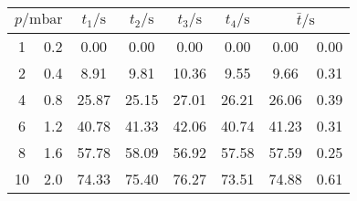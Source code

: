 \label{tab:tabDL1}
	\begin{tabular}{S[table-format=2.0]@{${}\pm{}$} S[table-format=1.1]S[table-format=2.2]S[table-format=2.2]S[table-format=2.2]S[table-format=2.2]S[table-format=2.2]@{${}\pm{}$} S[table-format=1.2]}
		\toprule
		 & {$t_1/\si{\second}$} & {$t_2/\si{\second}$} & {$t_3/\si{\second}$} & {$t_4/\si{\second}$} &  \\
		 & 0.2 & 0.00 & 0.00 & 0.00 & 0.00 & 0.00 & 0.00 \\
		 2 & 0.4 & 8.91 & 9.81 & 10.36 & 9.55 & 9.66 & 0.31 \\
		 4 & 0.8 & 25.87 & 25.15 & 27.01 & 26.21 & 26.06 & 0.39 \\
		 6 & 1.2 & 40.78 & 41.33 & 42.06 & 40.74 & 41.23 & 0.31 \\
		 8 & 1.6 & 57.78 & 58.09 & 56.92 & 57.58 & 57.59 & 0.25 \\
		10 & 2.0 & 74.33 & 75.40 & 76.27 & 73.51 & 74.88 & 0.61 \\
		\bottomrule
	\end{tabular}
